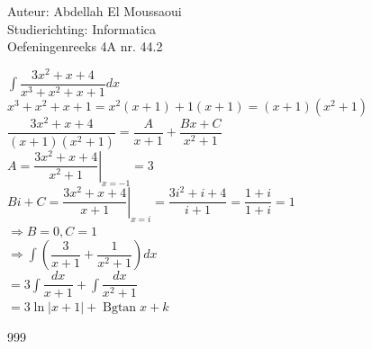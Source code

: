 \documentclass[a4paper]{article}
\begin{document}
  
\noindent \large Auteur: Abdellah El Moussaoui \\
\noindent \large Studierichting: Informatica\\
\noindent \large Oefeningenreeks 4A nr. 44.2\\

\medskip

\normalsize

$\displaystyle\int \dfrac{3x^2+x+4}{x^3+x^2+x+1}dx$\\

$x^3+x^2+x+1 = x^2 \left(x+1\right)+1 \left(x+1\right) = \left(x+1\right) \left(x^2+1\right)$\\

$\dfrac{3x^2+x+4}{\left(x+1\right) \left(x^2+1\right)} = \dfrac{A}{x+1} + \dfrac{Bx+C}{x^2+1}$\\

$A = \left. \dfrac{3x^2+x+4}{x^2+1}\right|_{x=-1} = 3$\\

$Bi+C = \left. \dfrac{3x^2+x+4}{x+1}\right|_{x=i} = \dfrac{3i^2+i+4}{i+1} = \dfrac{1+i}{1+i} = 1$\\

$\Rightarrow B = 0, C = 1$\\

$\Rightarrow \displaystyle\int \left(\dfrac{3}{x+1} + \dfrac{1}{x^2+1}\right)dx$\\

$= 3\displaystyle\int \dfrac{dx}{x+1} + \displaystyle\int \dfrac{dx}{x^2+1}$\\


$= 3\ln{\left|x+1\right|} + \operatorname{Bgtan}x + k$\\

\begin{thebibliography}{999}
\end{thebibliography}
\end{document}
